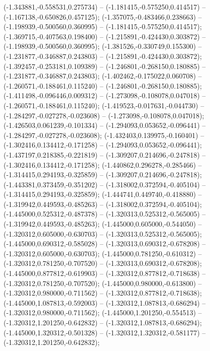  (-1.343881,-0.558531,0.275734) -- (-1.181415,-0.575250,0.414517) -- (-1.167138,-0.650826,0.457125);
 (-1.357075,-0.483466,0.238663) -- (-1.198939,-0.500560,0.360995) -- (-1.181415,-0.575250,0.414517);
 (-1.369715,-0.407563,0.198400) -- (-1.215891,-0.424430,0.303872) -- (-1.198939,-0.500560,0.360995);
 (-1.381526,-0.330749,0.155300) -- (-1.231877,-0.346887,0.243803) -- (-1.215891,-0.424430,0.303872);
 (-1.392457,-0.253181,0.109389) -- (-1.246801,-0.268150,0.180885) -- (-1.231877,-0.346887,0.243803);
 (-1.402462,-0.175022,0.060708) -- (-1.260571,-0.188461,0.115240) -- (-1.246801,-0.268150,0.180885);
 (-1.411498,-0.096446,0.009312) -- (-1.273098,-0.108078,0.047018) -- (-1.260571,-0.188461,0.115240);
 (-1.419523,-0.017631,-0.044730) -- (-1.284297,-0.027278,-0.023608) -- (-1.273098,-0.108078,0.047018);
 (-1.426503,0.061239,-0.101334) -- (-1.294093,0.053652,-0.096441) -- (-1.284297,-0.027278,-0.023608);
 (-1.432403,0.139975,-0.160401) -- (-1.302416,0.134412,-0.171258) -- (-1.294093,0.053652,-0.096441);
 (-1.437197,0.218385,-0.221819) -- (-1.309207,0.214696,-0.247818) -- (-1.302416,0.134412,-0.171258);
 (-1.440862,0.296278,-0.285466) -- (-1.314415,0.294193,-0.325859) -- (-1.309207,0.214696,-0.247818);
 (-1.443381,0.373459,-0.351202) -- (-1.318002,0.372594,-0.405104) -- (-1.314415,0.294193,-0.325859);
 (-1.444741,0.449740,-0.418880) -- (-1.319942,0.449593,-0.485263) -- (-1.318002,0.372594,-0.405104);
 (-1.445000,0.525312,-0.487378) -- (-1.320313,0.525312,-0.565005) -- (-1.319942,0.449593,-0.485263);
 (-1.445000,0.605000,-0.544050) -- (-1.320312,0.605000,-0.630703) -- (-1.320313,0.525312,-0.565005);
 (-1.445000,0.690312,-0.585028) -- (-1.320313,0.690312,-0.678208) -- (-1.320312,0.605000,-0.630703);
 (-1.445000,0.781250,-0.610312) -- (-1.320312,0.781250,-0.707520) -- (-1.320313,0.690312,-0.678208);
 (-1.445000,0.877812,-0.619903) -- (-1.320312,0.877812,-0.718638) -- (-1.320312,0.781250,-0.707520);
 (-1.445000,0.980000,-0.613800) -- (-1.320312,0.980000,-0.711562) -- (-1.320312,0.877812,-0.718638);
 (-1.445000,1.087813,-0.592003) -- (-1.320312,1.087813,-0.686294) -- (-1.320312,0.980000,-0.711562);
 (-1.445000,1.201250,-0.554513) -- (-1.320312,1.201250,-0.642832) -- (-1.320312,1.087813,-0.686294);
 (-1.445000,1.320312,-0.501328) -- (-1.320312,1.320312,-0.581177) -- (-1.320312,1.201250,-0.642832);
